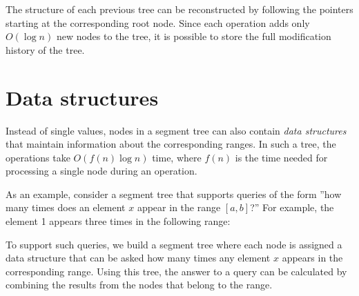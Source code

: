 The structure of each previous tree can be
reconstructed by following the pointers
starting at the corresponding root node.
Since each operation
adds only $O(\log n)$ new nodes to the tree,
it is possible to store the full modification history of the tree.

\section{Data structures}

Instead of single values, nodes in a segment tree
can also contain \emph{data structures} that maintain information
about the corresponding ranges.
In such a tree, the operations take
$O(f(n) \log n)$ time, where $f(n)$ is
the time needed for processing a single node during an operation.

As an example, consider a segment tree that
supports queries of the form
''how many times does an element $x$ appear
in the range $[a,b]$?''
For example, the element 1 appears three times
in the following range:

\begin{center}
\end{center}

To support such queries, we build a segment tree
where each node is assigned a data structure
that can be asked how many times any element $x$
appears in the corresponding range.
Using this tree,
the answer to a query can be calculated
by combining the results from the nodes
that belong to the range.

